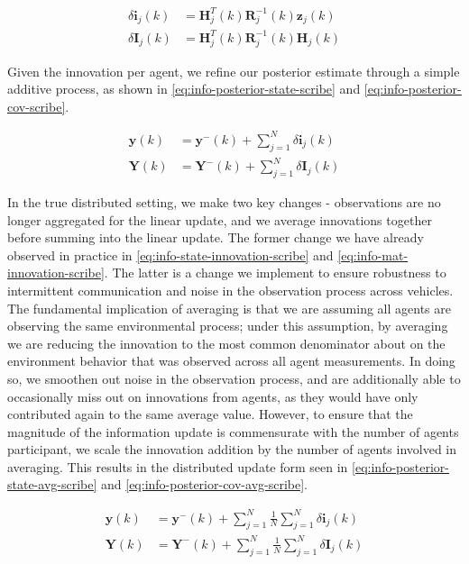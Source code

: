 \begin{align}
    \delta\mathbf{i}_j(k) &= \mathbf{H}_j^T(k)\mathbf{R}^{-1}_j(k)\mathbf{z}_j(k) \label{eq:info-state-innovation-scribe} \\
    \delta\mathbf{I}_j(k) &= \mathbf{H}_j^T(k)\mathbf{R}^{-1}_j(k)\mathbf{H}_j(k) \label{eq:info-mat-innovation-scribe}
\end{align}

Given the innovation per agent, we refine our posterior estimate through a simple additive process, as shown in \eqref{eq:info-posterior-state-scribe} and \eqref{eq:info-posterior-cov-scribe}.

\begin{align}
    \mathbf{y}(k) &= \mathbf{y}^-(k) + \sum_{j=1}^{N}\delta\mathbf{i}_j(k) \label{eq:info-posterior-state-scribe} \\
    \mathbf{Y}(k) &= \mathbf{Y}^-(k) + \sum_{j=1}^{N}\delta\mathbf{I}_j(k) \label{eq:info-posterior-cov-scribe}
\end{align}

In the true distributed setting, we make two key changes - observations are no longer aggregated for the linear update, and we average innovations together before summing into the linear update. The former change we have already observed in practice in \eqref{eq:info-state-innovation-scribe} and \eqref{eq:info-mat-innovation-scribe}. The latter is a change we implement to ensure robustness to intermittent communication and noise in the observation process across vehicles. The fundamental implication of averaging is that we are assuming all agents are observing the same environmental process; under this assumption, by averaging we are reducing the innovation to the most common denominator about on the environment behavior that was observed across all agent measurements. In doing so, we smoothen out noise in the observation process, and are additionally able to occasionally miss out on innovations from agents, as they would have only contributed again to the same average value. However, to ensure that the magnitude of the information update is commensurate with the number of agents participant, we scale the innovation addition by the number of agents involved in averaging. This results in the distributed update form seen in \eqref{eq:info-posterior-state-avg-scribe} and \eqref{eq:info-posterior-cov-avg-scribe}.

\begin{align}
    \mathbf{y}(k) &= \mathbf{y}^-(k) + \sum_{j=1}^{N}\frac{1}{N}\sum_{j=1}^{N}\delta\mathbf{i}_j(k) \label{eq:info-posterior-state-avg-scribe} \\
    \mathbf{Y}(k) &= \mathbf{Y}^-(k) + \sum_{j=1}^{N}\frac{1}{N}\sum_{j=1}^{N}\delta\mathbf{I}_j(k) \label{eq:info-posterior-cov-avg-scribe}
\end{align}

